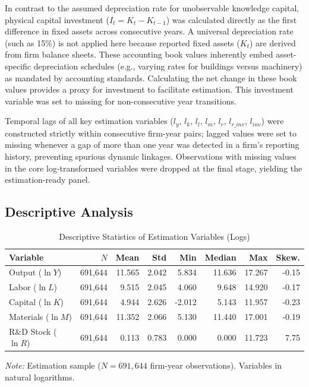 \documentclass[a4paper, 12pt]{article}
\begin{document}
In contrast to the assumed depreciation rate for unobservable knowledge capital, physical capital investment ($I_t = K_t - K_{t-1}$) was calculated directly as the first difference in fixed assets across consecutive years. A universal depreciation rate (such as 15\%) is not applied here because reported fixed assets ($K_t$) are derived from firm balance sheets. These accounting book values inherently embed asset-specific depreciation schedules (e.g., varying rates for buildings versus machinery) as mandated by accounting standards. Calculating the net change in these book values provides a proxy for investment to facilitate \textcite{olley1992dynamics} estimation. This investment variable was set to missing for non-consecutive year transitions.
 
Temporal lags of all key estimation variables ($l_y$, $l_k$, $l_l$, $l_m$, $l_r$, $l_{r\_inv}$, $l_{inv}$) were constructed strictly within consecutive firm-year pairs; lagged values were set to missing whenever a gap of more than one year was detected in a firm's reporting history, preventing spurious dynamic linkages. Observations with missing values in the core log-transformed variables were dropped at the final stage, yielding the estimation-ready panel. 

\subsection{Descriptive Analysis}

\begin{table}[htbp]
\centering
\caption{Descriptive Statistics of Estimation Variables (Logs)}
\label{tab:desc_log}
\begin{tabular}{lrrrrrrr}
\toprule
Variable & $N$ & Mean & Std & Min & Median & Max & Skew. \\
\midrule
  Output ($\ln Y$) & 691,644 & 11.565 & 2.042 & 5.834 & 11.636 & 17.267 & -0.15 \\
  Labor ($\ln L$) & 691,644 & 9.515 & 2.045 & 4.060 & 9.648 & 14.920 & -0.17 \\
  Capital ($\ln K$) & 691,644 & 4.944 & 2.626 & -2.012 & 5.143 & 11.957 & -0.23 \\
  Materials ($\ln M$) & 691,644 & 11.352 & 2.066 & 5.130 & 11.440 & 17.001 & -0.19 \\
  R\&D Stock ($\ln R$) & 691,644 & 0.113 & 0.783 & 0.000 & 0.000 & 11.723 & 7.75 \\
\bottomrule
\end{tabular}
\begin{flushleft}
\footnotesize
\textit{Note:} Estimation sample ($N = 691,644$ firm-year observations).
Variables in natural logarithms.
\end{flushleft}
\end{table}
\end{document}
